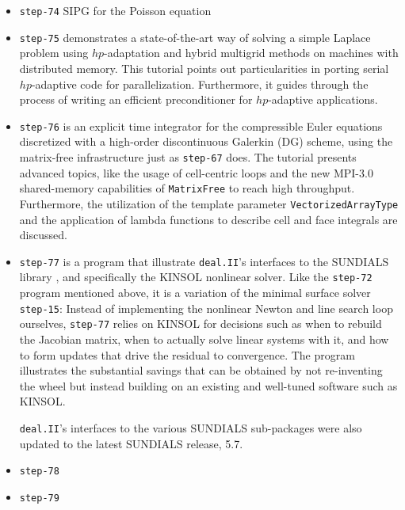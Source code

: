 \documentclass{ansarticle-preprint}
\newcommand{\specialword}[1]{\texttt{#1}}
\newcommand{\dealii}{{\specialword{deal.II}}\xspace}
\begin{document}
\begin{itemize}
\item \texttt{step-74} SIPG for the Poisson equation 
  
\item \texttt{step-75} demonstrates a state-of-the-art way of solving a simple
      Laplace problem using $hp$-adaptation and hybrid multigrid methods on machines
      with distributed memory. This tutorial points out particularities in porting
      serial $hp$-adaptive code for parallelization. Furthermore, it guides through
      the process of writing an efficient preconditioner for $hp$-adaptive applications.

\item \texttt{step-76} is an explicit time integrator for the
      compressible Euler equations discretized with a high-order discontinuous
      Galerkin (DG) scheme, using the matrix-free infrastructure just as \texttt{step-67} does.
      The tutorial presents advanced topics, like the usage of cell-centric loops and
      the new MPI-3.0 shared-memory capabilities of \texttt{MatrixFree} to reach high
      throughput. Furthermore, the utilization of the template parameter
      \texttt{VectorizedArrayType} and the application of lambda functions to describe cell and face
      integrals are discussed.

\item \texttt{step-77} is a program that illustrate \dealii{}'s
  interfaces to the SUNDIALS library \cite{sundials}, and specifically
  the KINSOL nonlinear solver. Like the \texttt{step-72} program
  mentioned above, it is a variation of the minimal surface solver
  \texttt{step-15}: Instead of implementing the nonlinear Newton and
  line search loop ourselves, \texttt{step-77} relies on KINSOL for
  decisions such as when to rebuild the Jacobian matrix, when to
  actually solve linear systems with it, and how to form updates that
  drive the residual to convergence. The program illustrates the
  substantial savings that can be obtained by not re-inventing the
  wheel but instead building on an existing and well-tuned software
  such as KINSOL.

  \dealii{}'s interfaces to the various SUNDIALS sub-packages were also updated to the latest SUNDIALS release, 5.7.

\item \texttt{step-78} 

\item \texttt{step-79} 
\end{itemize}
\end{document}
